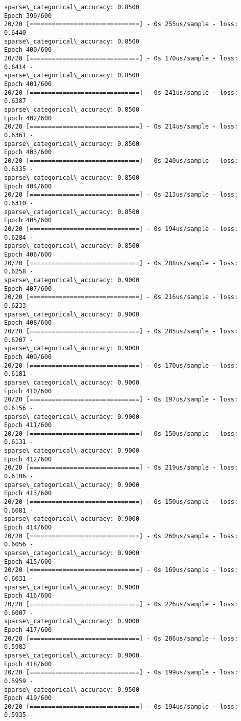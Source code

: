 \documentclass[11pt]{article}
\begin{document}
\begin{Verbatim}[commandchars=\\\{\}]
sparse\_categorical\_accuracy: 0.8500
Epoch 399/600
20/20 [==============================] - 0s 255us/sample - loss: 0.6440 -
sparse\_categorical\_accuracy: 0.8500
Epoch 400/600
20/20 [==============================] - 0s 170us/sample - loss: 0.6414 -
sparse\_categorical\_accuracy: 0.8500
Epoch 401/600
20/20 [==============================] - 0s 241us/sample - loss: 0.6387 -
sparse\_categorical\_accuracy: 0.8500
Epoch 402/600
20/20 [==============================] - 0s 214us/sample - loss: 0.6361 -
sparse\_categorical\_accuracy: 0.8500
Epoch 403/600
20/20 [==============================] - 0s 240us/sample - loss: 0.6335 -
sparse\_categorical\_accuracy: 0.8500
Epoch 404/600
20/20 [==============================] - 0s 213us/sample - loss: 0.6310 -
sparse\_categorical\_accuracy: 0.8500
Epoch 405/600
20/20 [==============================] - 0s 194us/sample - loss: 0.6284 -
sparse\_categorical\_accuracy: 0.8500
Epoch 406/600
20/20 [==============================] - 0s 208us/sample - loss: 0.6258 -
sparse\_categorical\_accuracy: 0.9000
Epoch 407/600
20/20 [==============================] - 0s 216us/sample - loss: 0.6233 -
sparse\_categorical\_accuracy: 0.9000
Epoch 408/600
20/20 [==============================] - 0s 205us/sample - loss: 0.6207 -
sparse\_categorical\_accuracy: 0.9000
Epoch 409/600
20/20 [==============================] - 0s 170us/sample - loss: 0.6181 -
sparse\_categorical\_accuracy: 0.9000
Epoch 410/600
20/20 [==============================] - 0s 197us/sample - loss: 0.6156 -
sparse\_categorical\_accuracy: 0.9000
Epoch 411/600
20/20 [==============================] - 0s 150us/sample - loss: 0.6131 -
sparse\_categorical\_accuracy: 0.9000
Epoch 412/600
20/20 [==============================] - 0s 219us/sample - loss: 0.6106 -
sparse\_categorical\_accuracy: 0.9000
Epoch 413/600
20/20 [==============================] - 0s 150us/sample - loss: 0.6081 -
sparse\_categorical\_accuracy: 0.9000
Epoch 414/600
20/20 [==============================] - 0s 260us/sample - loss: 0.6056 -
sparse\_categorical\_accuracy: 0.9000
Epoch 415/600
20/20 [==============================] - 0s 169us/sample - loss: 0.6031 -
sparse\_categorical\_accuracy: 0.9000
Epoch 416/600
20/20 [==============================] - 0s 226us/sample - loss: 0.6007 -
sparse\_categorical\_accuracy: 0.9000
Epoch 417/600
20/20 [==============================] - 0s 206us/sample - loss: 0.5983 -
sparse\_categorical\_accuracy: 0.9000
Epoch 418/600
20/20 [==============================] - 0s 199us/sample - loss: 0.5959 -
sparse\_categorical\_accuracy: 0.9500
Epoch 419/600
20/20 [==============================] - 0s 194us/sample - loss: 0.5935 -

\end{Verbatim}
\end{document}
